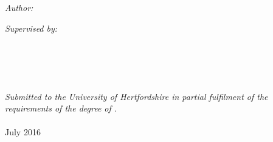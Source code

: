 \documentclass[11pt, oneside]{Thesis} %
\begin{document}
\begin{titlepage}
\begin{center}

\textsc{}\\[1.5cm] %
\textsc{}\\[0.5cm] %

\textsc{}\\[0.4cm]
{\huge \bfseries \ttitle}\\[0.4cm] %
\textsc{}\\[1.5cm]
 
\begin{minipage}{0.4\textwidth}
\begin{flushleft} \large
\emph{Author:}\\
{\authornames} %
\end{flushleft}
\end{minipage}
\begin{minipage}{0.4\textwidth}
\begin{flushright} \large
\emph{Supervised by:} \\
{\supname} %
\end{flushright}
\end{minipage}\\[3cm]


\groupname\\\deptname\\\univname\\[2cm] %
\large \textit{Submitted to the University of Hertfordshire in partial fulfilment of the requirements of the degree of \degreename.}\\[0.3cm] %
\textit{}\\[0.4cm]
 
{\large July 2016}\\[4cm] %
 
\vfill
\end{center}

\end{titlepage}

\clearpage %

\end{document}
